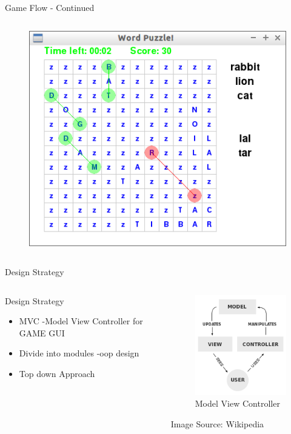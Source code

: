 \documentclass{beamer}
\begin{document}
\begin{frame}{Game Flow - Continued}
\begin{columns}[c]
\begin{column}{3cm}
\begin{figure}
\includegraphics[scale=0.2]{puzzle_running.png}
\end{figure}
\end{column}

\end{columns}
\end{frame}

\begin{frame}{Design Strategy}
\begin{columns}[c]
\begin{column}{5cm}
\begin{block}{Design Strategy}
\begin{itemize}
\item MVC -Model View  Controller for GAME GUI
\item Divide into modules -oop design
\item Top down Approach
\end{itemize}
\end{block}
\end{column}

\begin{column}{5cm}

\begin{figure}
\includegraphics[scale=0.7]{mvc.png}
\caption{Model View Controller}
\end{figure}
\small{Image Source: Wikipedia}
\end{column}
\end{columns}

\end{frame}
\end{document}
